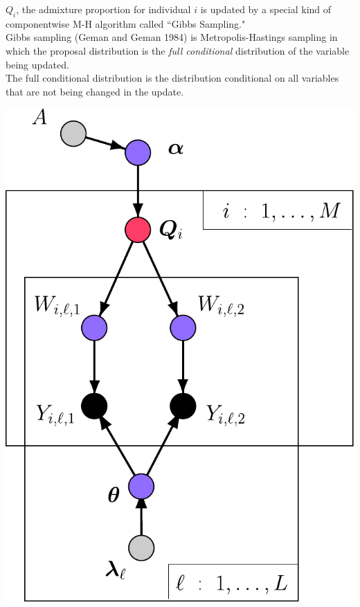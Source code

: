 \begin{minipage}{.47\textwidth}
$Q_i$, the admixture proportion for individual $i$ is updated by a special kind of componentwise M-H algorithm called ``Gibbs Sampling."\\


Gibbs sampling (Geman and Geman 1984) is Metropolis-Hastings sampling in which the proposal distribution is the {\em full conditional} distribution of the variable being updated.  \\


The full conditional distribution is the distribution conditional on all variables that are not being changed in the update.
\end{minipage}
\hfill
\begin{minipage}{.51\textwidth}
\vfill
\hfill\includegraphics*[width=.95\textwidth]{illus/PritchSimple2_purpQprime.pdf}
\vfill
\end{minipage}

